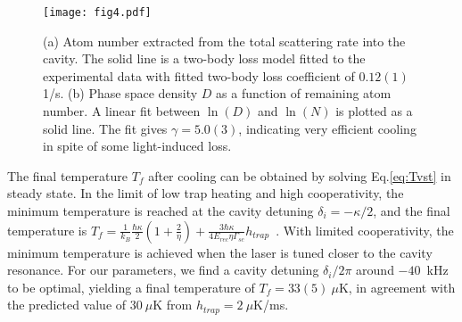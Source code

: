 \documentclass[aps,prl,superscriptaddress,onecloumn,nobibnotes]{revtex4-1}
\begin{document}



\begin{figure}[!th]
\centerline{\texttt{[image: fig4.pdf]}}
\caption{(a) Atom number extracted from the total scattering rate into the cavity. The solid line is a two-body loss model fitted to the experimental data with fitted two-body loss coefficient of $0.12(1)$ 1/s. (b) Phase space density $D$ as a function of remaining atom number. A linear fit between $\ln(D)$ and $\ln(N)$ is plotted as a solid line. The fit gives $\gamma=5.0(3)$, indicating very efficient cooling in spite of some light-induced loss.}
\label{fig4}
\end{figure}

The final temperature $T_{f}$ after cooling can be obtained by solving Eq.\ref{eq:Tvst} in steady state. In the limit of low trap heating and high cooperativity, the minimum temperature is reached at the cavity detuning $\delta_i=-\kappa/2$, and the final temperature is 
$T_{f}=\frac{1}{k_B}\frac{\hbar\kappa}{2} (1+\frac{2}{\eta})+\frac{3\hbar\kappa}{4E_{rec}\eta\Gamma_{sc}}h_{trap}$~\cite{VV:pra2001}. With limited cooperativity, the minimum temperature is achieved when the laser is tuned closer to the cavity resonance. For our parameters, we find a cavity detuning $\delta_i/2\pi$ around $-40$~kHz to be optimal, yielding a final temperature of $T_f=33(5)~\mu$K, in agreement with the predicted value of $30~\mu$K from $h_{trap}=2~\mu$K/ms. 

\end{document}
